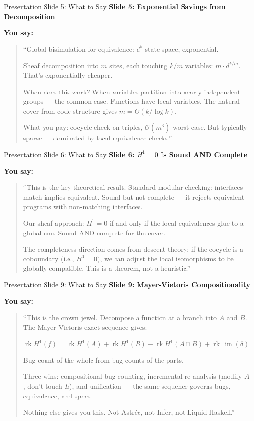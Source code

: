 \documentclass[aspectratio=169,10pt]{beamer}
\newcommand{\im}{\operatorname{im}}
\newcommand{\rk}{\operatorname{rk}}
\begin{document}
\begin{frame}{Presentation Slide 5: What to Say}
\textbf{Slide 5: Exponential Savings from Decomposition}

\textbf{You say:}
\begin{quote}
``Global bisimulation for equivalence: $d^k$ state space, exponential.

Sheaf decomposition into $m$ sites, each touching $k/m$ variables: $m \cdot d^{k/m}$. That's exponentially cheaper.

When does this work? When variables partition into nearly-independent groups --- the common case. Functions have local variables. The natural cover from code structure gives $m = \Theta(k/\log k)$.

What you pay: cocycle check on triples, $\mathcal{O}(m^3)$ worst case. But typically sparse --- dominated by local equivalence checks.''
\end{quote}
\end{frame}

\begin{frame}{Presentation Slide 6: What to Say}
\textbf{Slide 6: $H^1 = 0$ Is Sound AND Complete}

\textbf{You say:}
\begin{quote}
``This is the key theoretical result. Standard modular checking: interfaces match implies equivalent. Sound but not complete --- it rejects equivalent programs with non-matching interfaces.

Our sheaf approach: $H^1 = 0$ if and only if the local equivalences glue to a global one. Sound AND complete for the cover.

The completeness direction comes from descent theory: if the cocycle is a coboundary (i.e., $H^1 = 0$), we can adjust the local isomorphisms to be globally compatible. This is a theorem, not a heuristic.''
\end{quote}
\end{frame}

\begin{frame}{Presentation Slide 9: What to Say}
\textbf{Slide 9: Mayer-Vietoris Compositionality}

\textbf{You say:}
\begin{quote}
``This is the crown jewel. Decompose a function at a branch into $A$ and $B$. The Mayer-Vietoris exact sequence gives:

$\rk H^1(f) = \rk H^1(A) + \rk H^1(B) - \rk H^1(A \cap B) + \rk\,\im(\delta)$

Bug count of the whole from bug counts of the parts.

Three wins: compositional bug counting, incremental re-analysis (modify $A$, don't touch $B$), and unification --- the same sequence governs bugs, equivalence, and specs.

Nothing else gives you this. Not Astr\'ee, not Infer, not Liquid Haskell.''
\end{quote}
\end{frame}
\end{document}
